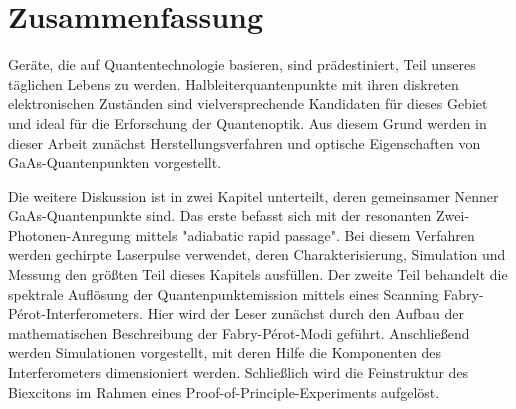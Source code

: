 
\chapter*{Zusammenfassung}
\label{cha:zusammenfassung}


Geräte, die auf Quantentechnologie basieren, sind prädestiniert, Teil unseres täglichen Lebens zu werden.
Halbleiterquantenpunkte mit ihren diskreten elektronischen Zuständen sind vielversprechende Kandidaten für dieses Gebiet und ideal für die Erforschung der Quantenoptik.
Aus diesem Grund werden in dieser Arbeit zunächst Herstellungsverfahren und optische Eigenschaften von GaAs-Quantenpunkten vorgestellt.

Die weitere Diskussion ist in zwei Kapitel unterteilt, deren gemeinsamer Nenner GaAs-Quantenpunkte sind.
Das erste befasst sich mit der resonanten Zwei-Photonen-Anregung mittels "adiabatic rapid passage".
Bei diesem Verfahren werden gechirpte Laserpulse verwendet, deren Charakterisierung, Simulation und Messung den größten Teil dieses Kapitels ausfüllen.
Der zweite Teil behandelt die spektrale Auflösung der Quantenpunktemission mittels eines Scanning Fabry-Pérot-Interferometers.
Hier wird der Leser zunächst durch den Aufbau der mathematischen Beschreibung der Fabry-Pérot-Modi geführt.
Anschließend werden Simulationen vorgestellt, mit deren Hilfe die Komponenten des Interferometers dimensioniert werden.
Schließlich wird die Feinstruktur des Biexcitons im Rahmen eines Proof-of-Principle-Experiments aufgelöst.

